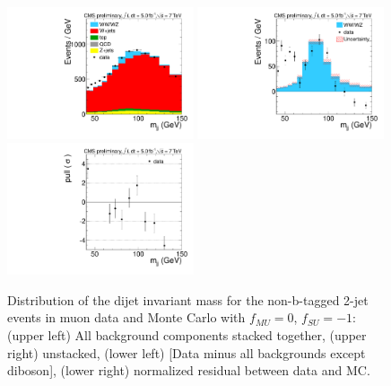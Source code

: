 \begin{figure}[h!]
  {\centering
    \includegraphics[width=0.49\textwidth]{figs/ScaleAndMatchingCrossChecks/mu2JNoBTag_fSUm1fMU0/Wjj_Diboson_Muon_2jets_Stacked.pdf}
    \includegraphics[width=0.49\textwidth]{figs/ScaleAndMatchingCrossChecks/mu2JNoBTag_fSUm1fMU0/Wjj_Diboson_Muon_2jets_Subtracted.pdf}
    \includegraphics[width=0.49\textwidth]{figs/ScaleAndMatchingCrossChecks/mu2JNoBTag_fSUm1fMU0/Wjj_Diboson_Muon_2jets_Pull.pdf}
    \caption{Distribution of the dijet invariant mass for the non-b-tagged 2-jet events in muon data and Monte Carlo with $f_{MU}=0$, $f_{SU}=-1$: 
      (upper left) All background components stacked together, 
      (upper right) unstacked, (lower left) [Data minus all backgrounds except diboson],  
      (lower right) normalized residual between data and MC. }
    \label{fig:fsufmuXcheck_fSUm1fMU0}}
\end{figure}
